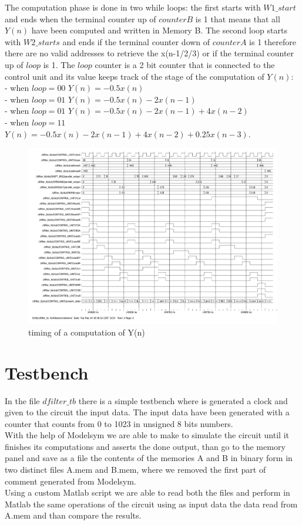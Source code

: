 \documentclass[12pt]{article}
\begin{document}
The computation phase is done in two while loops: the first starts with $W1\_start$ and ends when the terminal counter up of $counterB$ is 1 that means that all $Y(n)$ have been computed and written in Memory B. The second loop starts with $W2\_starts$ and ends if the terminal counter down of $counterA$ is 1 therefore there are no valid addresses to retrieve the x(n-1/2/3) or if the terminal counter up of $loop$ is 1. The $loop$ counter is a 2 bit counter that is connected to the control unit and its value keeps track of the stage of the computation of $Y(n)$:\\
- when $loop=00$ $Y(n)=-0.5x(n)$ \\
- when $loop=01$ $Y(n)=-0.5x(n)-2x(n-1)$\\
- when $loop=01$ $Y(n)=-0.5x(n)-2x(n-1)+4x(n-2)$\\
- when $loop=11$ $Y(n)=-0.5x(n)-2x(n-1)+4x(n-2)+0.25x(n-3)$.\\

\begin{figure}[h]
	
	\includegraphics[scale = 0.59]{immagini/timing2.pdf}
	\caption{timing of a computation of Y(n)}
\end{figure}



\section*{Testbench}
In the file $dfilter\_tb$ there is a simple testbench where is generated a clock and given to the circuit the input data. The input data have been generated with a counter that counts from 0 to 1023 in unsigned 8 bits numbers. \\
With the help of Modelsym we are able to make to simulate the circuit until it finishes its computations and asserts the done output, than go to the memory panel and save as a file the contents of the memories A and B in binary form in two distinct files A.mem and B.mem, where we removed the first part of comment generated from Modelsym. \\
Using a custom Matlab script we are able to read both the files and perform in Matlab the same operations of the circuit using as input data the data read from A.mem and than compare the results. 
\end{document}
